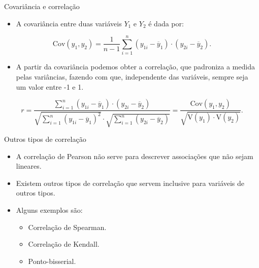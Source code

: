 \documentclass[
  ignorenonframetext,
  serif,
  professionalfont,
  usenames,
  dvipsnames,
  aspectratio = 169]{beamer}
\providecommand{\tightlist}{%
  \setlength{\itemsep}{0pt}\setlength{\parskip}{0pt}}
\renewcommand{\tightlist}{%
  \setlength{\itemsep}{0\baselineskip}
  \setlength{\parskip}{0.25\baselineskip}
}
\def\beginAHalfColumn{\begin{minipage}{0.49\textwidth}}%
\def\endColumns{\end{minipage}}%
\begin{document}
\begin{frame}{Covariância e correlação}
\protect\hypertarget{covariuxe2ncia-e-correlauxe7uxe3o}{}
\begin{itemize}
\tightlist
\item
  A covariância entre duas variáveis \(Y_1\) e \(Y_2\) é dada por:
\end{itemize}

\[
\textrm{Cov}(y_1, y_2) = \frac{1}{n - 1}
         \displaystyle\sum_{i = 1}^{n}
         (y_{1i} - \overline{y}_1)\cdot
         (y_{2i} - \overline{y}_2).
\]

\begin{itemize}
\tightlist
\item
  A partir da covariância podemos obter a correlação, que padroniza a
  medida pelas variâncias, fazendo com que, independente das variáveis,
  sempre seja um valor entre -1 e 1.
\end{itemize}

\[
    r = \frac{\sum_{i = 1}^{n}
      (y_{1i} - \overline{y}_1)\cdot (y_{2i} - \overline{y}_2)}{
      \sqrt{\sum_{i = 1}^{n} (y_{1i} - \overline{y}_1)^2}\cdot
      \sqrt{\sum_{i = 1}^{n} (y_{2i} - \overline{y}_2)}} =
      \frac{\textrm{Cov}(y_1, y_2)}{
        \sqrt{\textrm{V}(y_1)\cdot \textrm{V}(y_2)}}.
\]
\end{frame}

\begin{frame}{Outros tipos de correlação}
\protect\hypertarget{outros-tipos-de-correlauxe7uxe3o}{}
\beginAHalfColumn

\begin{itemize}
\item
  A correlação de Pearson não serve para descrever associações que não
  sejam lineares.
\item
  Existem outros tipos de correlação que servem inclusive para variáveis
  de outros tipos.
\end{itemize}

\endColumns
\beginAHalfColumn

\begin{itemize}
\tightlist
\item
  Alguns exemplos são:

  \begin{itemize}
  \tightlist
  \item
    Correlação de Spearman.
  \item
    Correlação de Kendall.
  \item
    Ponto-bisserial.
  \end{itemize}
\end{itemize}

\endColumns
\end{frame}
\end{document}
